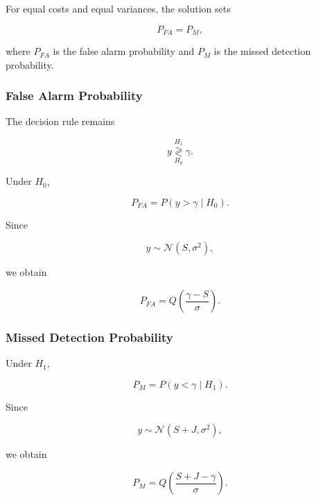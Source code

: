 \documentclass{article}
\begin{document}
For equal costs and equal variances, the solution sets

\begin{equation}
P_{FA}=P_M,
\end{equation}

where $P_{FA}$ is the false alarm probability and $P_M$ is the missed detection probability.

\subsubsection{False Alarm Probability}

The decision rule remains

\begin{equation}
y \underset{H_0}{\overset{H_1}{\gtrless}} \gamma.
\end{equation}

Under $H_0$,

\begin{equation}
P_{FA}
=
P(y>\gamma \mid H_0).
\end{equation}

Since

\begin{equation}
y \sim \mathcal{N}(S,\sigma^2),
\end{equation}

we obtain

\begin{equation}
P_{FA}
=
Q\!\left(
\frac{\gamma-S}{\sigma}
\right).
\end{equation}

\subsubsection{Missed Detection Probability}

Under $H_1$,

\begin{equation}
P_M
=
P(y<\gamma \mid H_1).
\end{equation}

Since

\begin{equation}
y \sim \mathcal{N}(S+J,\sigma^2),
\end{equation}

we obtain

\begin{equation}
P_M
=
Q\!\left(
\frac{S+J-\gamma}{\sigma}
\right).
\end{equation}
\end{document}
